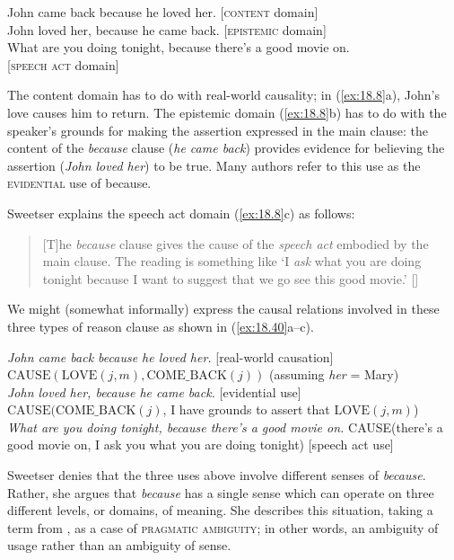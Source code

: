 \ea \label{ex:18.8}
\ea  John came back because he loved her.  \hfill  [\textsc{content} domain]\\
\ex John loved her, because he came back. \hfill   [\textsc{epistemic} domain]\\
\ex What are you doing tonight, because there’s a good movie on. \\
\hfill [\textsc{speech act} domain]
                       \z
\z


The content domain has to do with real-world causality; in (\ref{ex:18.8}a), John’s love causes him to return. The epistemic domain (\ref{ex:18.8}b) has to do with the speaker’s grounds for making the assertion expressed in the main clause: the content of the \textit{because} clause (\textit{he came back}) provides evidence for believing the assertion (\textit{John loved her}) to be true. Many authors refer to this use as the \textsc{evidential} use of because.


Sweetser explains the speech act domain (\ref{ex:18.8}c) as follows:


\begin{quote}
{}[T]he \textit{because} clause gives the cause of the \textit{speech act} embodied by the main clause. The reading is something like ‘I \textit{ask} what you are doing tonight because I want to suggest that we go see this good movie.’ [\citeyear[77]{Sweetser1990}]
\end{quote}


We might (somewhat informally) express the causal relations involved in these three types of reason clause as shown in (\ref{ex:18.40}a–c).


\ea \label{ex:18.40}
\ea  \textit{John came back because he loved her.}  \hfill  [real-world causation]
$\text{CAUSE}(\text{LOVE}(j,m), \text{COME\_BACK}(j))$  \hfill (assuming \textit{her} = Mary)\\
\ex \textit{John loved her, because he came back.} \hfill   [evidential use] 
$\text{CAUSE}(\text{COME\_BACK}(j)$, I have grounds to assert that $\text{LOVE}(j,m)$)\\
\ex \textit{What are you doing tonight, because there’s a good movie on.}
\newline
CAUSE(there’s a good movie on, I ask you what you are doing tonight) 
\hfill [speech act use]
                       \z
\z


Sweetser denies that the three uses above involve different senses of \textit{because}. Rather, she argues that \textit{because} has a single sense which can operate on three different levels, or domains, of meaning. She describes this situation, taking a term from \citet{Horn1985}, as a case of \textsc{pragmatic ambiguity}; in other words, an ambiguity of usage rather than an ambiguity of sense.



